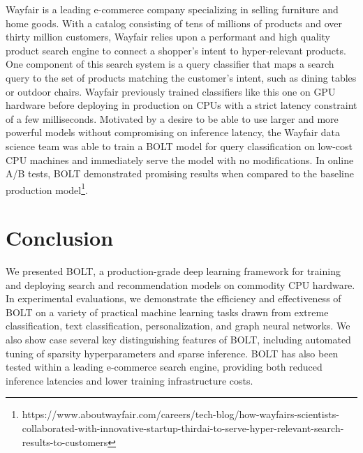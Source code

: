 \documentclass[sigconf]{acmart}
\begin{document}
Wayfair is a leading e-commerce company specializing in selling furniture and home goods. With a catalog consisting of tens of millions of products and over thirty million customers, Wayfair relies upon a performant and high quality product search engine to connect a shopper's intent to hyper-relevant products. One component of this search system is a query classifier that maps a search query to the set of products matching the customer's intent, such as dining tables or outdoor chairs. Wayfair previously trained classifiers like this one on GPU hardware before deploying in production on CPUs with a strict latency constraint of a few milliseconds. Motivated by a desire to be able to use larger and more powerful models without compromising on inference latency, the Wayfair data science team was able to train a BOLT model for query classification on low-cost CPU machines and immediately serve the model with no modifications. In online A/B tests, BOLT demonstrated promising results when compared to the baseline production model\footnote{https://www.aboutwayfair.com/careers/tech-blog/how-wayfairs-scientists-collaborated-with-innovative-startup-thirdai-to-serve-hyper-relevant-search-results-to-customers}. 







\section{Conclusion}

We presented BOLT, a production-grade deep learning framework for training and deploying search and recommendation models on commodity CPU hardware. In experimental evaluations, we demonstrate the efficiency and effectiveness of BOLT on a variety of practical machine learning tasks drawn from extreme classification, text classification, personalization, and graph neural networks. We also show
case several key distinguishing features of BOLT, including automated tuning of sparsity hyperparameters and sparse inference. BOLT has also been tested within a leading e-commerce search engine, providing both reduced inference latencies and lower training infrastructure costs. 
















\end{document}
